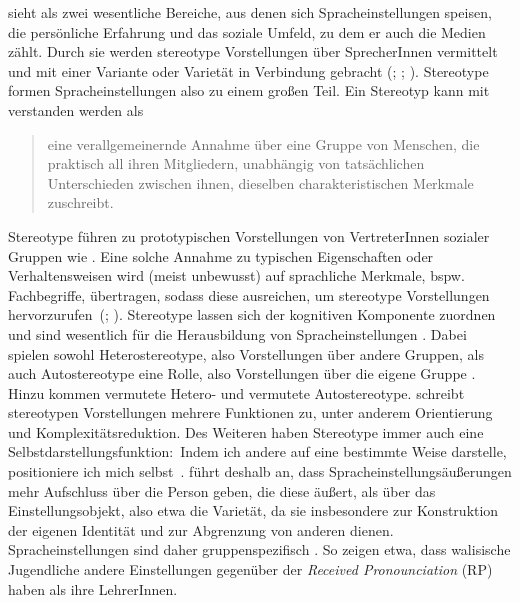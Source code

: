 \citet[22]{Garrett.2012} sieht als zwei wesentliche Bereiche, aus denen sich Spracheinstellungen speisen, die pers{\"o}nliche Erfahrung und das soziale Umfeld, zu dem er auch die Medien z{\"a}hlt.
Durch sie werden stereotype Vorstellungen {\"u}ber SprecherInnen vermittelt und mit einer Variante oder Variet{\"a}t in Verbindung gebracht (\citealp[s.][180]{Gartig2010}; \citealp[180]{Plewnia.2011}; \citealp[37]{Preston2004}). 
Stereotype formen Spracheinstellungen also zu einem großen Teil. 
Ein Stereotyp kann mit \citet{Aronson.2014} verstanden werden als
\begin{quote} eine verallgemeinernde Annahme über eine Gruppe von Menschen, die praktisch all ihren Mitgliedern, unabhängig von tatsächlichen Unterschieden zwischen ihnen, dieselben charakteristischen Merkmale zuschreibt. \citep[476]{Aronson.2014} \end{quote} 
Stereotype führen zu prototypischen Vorstellungen von VertreterInnen sozialer Gruppen wie  \citep[s.][142]{Riehl.2000}.
Eine solche Annahme zu typischen Eigenschaften oder Verhaltensweisen wird (meist unbewusst) auf sprachliche Merkmale, bspw. Fachbegriffe, übertragen, sodass diese ausreichen, um stereotype Vorstellungen hervorzurufen~(\citealp[s.][81]{Hundt.1992}; \citealp[38--39]{Preston2004}). 
Stereotype lassen sich der kognitiven Komponente zuordnen und sind wesentlich für die Herausbildung von Spracheinstellungen \citep[s.][201]{Jonas.2014}. 
Dabei spielen sowohl Heterostereotype, also Vorstellungen über andere Gruppen, als auch Autostereotype eine Rolle, also Vorstellungen über die eigene Gruppe \citep[s.][6--7]{Hundt.1992}. 
Hinzu kommen vermutete Hetero- und vermutete Autostereotype. 
\citet[7]{Hundt.1992} schreibt stereotypen Vorstellungen mehrere Funktionen zu, unter anderem Orientierung und Komplexitätsreduktion. 
Des Weiteren haben Stereotype immer auch eine Selbstdarstellungsfunktion:~Indem ich andere auf eine bestimmte Weise darstelle, positioniere ich mich selbst~\citep[s.][7]{Hundt.1992}. 
\citet[728]{Neuland.1993} f{\"u}hrt deshalb an, dass Spracheinstellungs{\"a}u{\ss}erungen mehr Aufschluss {\"u}ber die Person geben, die diese {\"a}u{\ss}ert, als {\"u}ber das Einstellungsobjekt, also etwa die Variet{\"a}t, da sie insbesondere zur Konstruktion der eigenen Identit{\"a}t und zur Abgrenzung von anderen dienen. 
Spracheinstellungen sind daher gruppenspezifisch \citep[s.][627]{Garrett.2001}. So zeigen \citet{Garrett.1999} etwa, dass walisische Jugendliche andere Einstellungen gegenüber der \textit{Received Pronounciation} (RP) haben als ihre LehrerInnen. 

